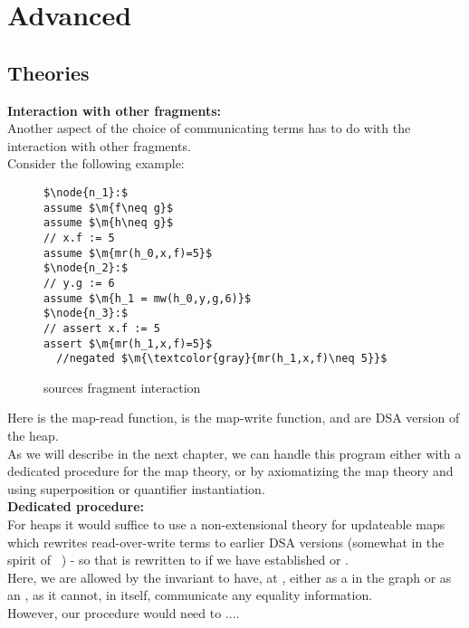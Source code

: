 \chapter{Advanced}

\section{Theories}

\noindent
\textbf{Interaction with other fragments:}\\
Another aspect of the choice of communicating terms has to do with the interaction with other fragments.\\
Consider the following example:
\begin{figure}[H]
\begin{lstlisting}
$\node{n_1}:$ 
assume $\m{f\neq g}$
assume $\m{h\neq g}$
// x.f := 5
assume $\m{mr(h_0,x,f)=5}$
$\node{n_2}:$ 
// y.g := 6
assume $\m{h_1 = mw(h_0,y,g,6)}$
$\node{n_3}:$ 
// assert x.f := 5
assert $\m{mr(h_1,x,f)=5}$
  //negated $\m{\textcolor{gray}{mr(h_1,x,f)\neq 5}}$
\end{lstlisting}
\caption{sources fragment interaction}
\label{snippet3.16i}
\end{figure}
Here  is the map-read function,  is the map-write function, and  are DSA version of the heap.\\
As we will describe in the next chapter, we can handle this program either with a dedicated procedure for the map theory, 
or by axiomatizing the map theory and using superposition or quantifier instantiation.\\
\textbf{Dedicated procedure:}\\
For heaps it would suffice to use a non-extensional theory for updateable maps which rewrites read-over-write terms to earlier DSA versions (somewhat in the spirit of ~\cite{ChangLeino2005}) -  
so that  is rewritten to  if we have established  or .\\
Here, we are allowed by the invariant to have, at ,  either as a \gfa in the graph or as an \rgfa, as it cannot, in itself, communicate any equality information.\\
However, our procedure would need to ....

